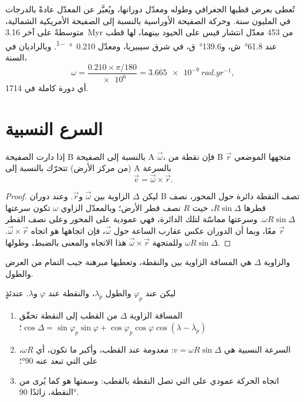 تُعطى  بعرض قطبها الجغرافي وطوله ومعدّل دورانها، ويُعبَّر عن المعدّل عادةً بالدرجات في المليون سنة. وحركة الصفيحة الأوراسية بالنسبة إلى الصفيحة الأمريكية الشمالية، متوسطةً على آخر \qty{3.16}{Myr} من 453 معدّل انتشار قيس على الحيود بينهما، لها قطب عند \ang{61.8}~ش، و\ang{139.6}~ق، في شرق سيبيريا، ومعدّل \qty{0.210}{\degree\per\Myr}. وبالراديان في السنة،
\[
  \omega = \frac{0.210\times\pi/180}{\num{e6}} = \qty{3.665e-9}{rad.yr^{-1}},
\]
أي دورة كاملة في \qty{1714}{\Myr}.

\section{السرع النسبية}

\begin{theorem}\label{thm:b1:plate-kinematics:velocity}
إذا دارت الصفيحة B بالنسبة إلى الصفيحة A  $\vec\omega$، فإن نقطة من B متجهها الموضعي $\vec r$ (من مركز الأرض) تتحرّك بالنسبة إلى A بالسرعة
\[
  \vec v = \vec\omega\times\vec r .
\]
\end{theorem}

\begin{proof}
ليكن $\Delta$ الزاوية بين $\vec\omega$ و$\vec r$. وعند دوران B تصف النقطة دائرة حول المحور، نصف قطرها $R\sin\Delta$، حيث $R$ نصف قطر الأرض؛ وبالمعدّل الزاوي $\omega$ تكون سرعتها $\omega R\sin\Delta$. وسرعتها مماسّة لتلك الدائرة، فهي عمودية على المحور وعلى نصف القطر $\vec r$ معًا، وبما أن الدوران عكس عقارب الساعة حول $\vec\omega$، فإن اتجاهها هو اتجاه $\vec\omega\times\vec r$. وللمتجهة $\vec\omega\times\vec r$ هذا الاتجاه والمعنى بالضبط، وطولها $\omega R\sin\Delta$.
\end{proof}

والزاوية $\Delta$ هي المسافة الزاوية بين  والنقطة، وتعطيها مبرهنة جيب التمام من العرض والطول.

\begin{proposition}\label{prop:b1:plate-kinematics:speed}
ليكن  عند  $\varphi_p$ والطول $\lambda_p$، والنقطة عند $\varphi$ و$\lambda$. عندئذٍ
\begin{enumerate}
  \item المسافة الزاوية $\Delta$ من القطب إلى النقطة تحقّق $\cos\Delta = \sin\varphi_p\sin\varphi + \cos\varphi_p\cos\varphi
        \cos(\lambda - \lambda_p)$؛
  \item السرعة النسبية هي $v = \omega R\sin\Delta$: معدومة عند القطب، وأكبر ما تكون، أي $\omega R$، على  التي تبعد عنه \ang{90}؛
  \item اتجاه الحركة عمودي على  التي تصل النقطة بالقطب: وسمتها هو  كما يُرى من النقطة، زائدًا \ang{90}.
\end{enumerate}
\end{proposition}

